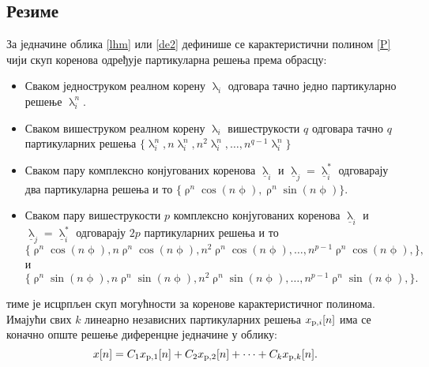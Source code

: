 \subsection*{Резиме} 
За једначине облика \eqref{lhm} или 
\eqref{de2} дефинише се карактеристични полином 
\eqref{P} чији скуп коренова одређује партикуларна 
решења према обрасцу:
\begin{itemize}
\item Сваком једноструком реалном корену $\uplambda_i$ 
одговара тачно једно партикуларно решење $\uplambda_i^n$.
\item Сваком вишеструком реалном корену $\uplambda_i$ 
вишеструкости $q$ одговара тачно $q$ партикуларних 
решења $\{\uplambda_i^n, n\uplambda_i^n, 
n^2\uplambda_i^n, \ldots, n^{q-1}\uplambda_i^n\}$
\item Сваком пару комплексно конјугованих коренова 
$\underline\uplambda_i$ и $\underline\uplambda_j 
= \underline\uplambda_i^*$ одговарају два партикуларна
решења и то $\{\uprho^n \cos(n\upphi), 
\uprho^n \sin(n\upphi)\}$.
\item Сваком пару вишеструкости $p$ комплексно конјугованих коренова 
$\underline\uplambda_i$ и $\underline\uplambda_j 
= \underline\uplambda_i^*$ одговарају $2p$
партикуларних
решења и то 
$$\{\uprho^n \cos(n\upphi), 
n\uprho^n \cos(n\upphi), 
n^2\uprho^n \cos(n\upphi), 
\ldots,
n^{p-1}\uprho^n \cos(n\upphi), 
\},$$
и
$$\{\uprho^n \sin(n\upphi), 
n\uprho^n \sin(n\upphi), 
n^2\uprho^n \sin(n\upphi), \ldots,
n^{p-1}\uprho^n \sin(n\upphi), 
\}.$$
\end{itemize}
тиме је исцрпљен скуп могућности за коренове 
карактеристичног полинома. Имајући свих $k$ 
линеарно независних партикуларних решења 
$x_{{\rm p},i}[n]$
има се коначно опште решење диференцне једначине у 
облику:
\begin{equation}
x[n] = C_1 x_{{\rm p},1}[n] +
 C_2 x_{{\rm p},2}[n] + \cdots + C_k x_{{\rm p},k}[n].
\end{equation}

